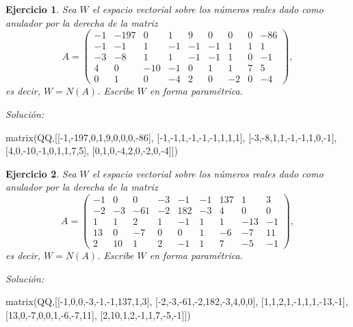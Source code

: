 \documentclass{amsart}
\newtheorem{ejer}{Ejercicio}
\begin{document}


\begin{ejer} Sea $W$ el espacio vectorial sobre los números reales dado
como anulador por la derecha de la matriz 
\[A = \left(\begin{array}{rrrrrrrrr}
-1 & -197 & 0 & 1 & 9 & 0 & 0 & 0 & -86 \\
-1 & -1 & 1 & -1 & -1 & -1 & 1 & 1 & 1 \\
-3 & -8 & 1 & 1 & -1 & -1 & 1 & 0 & -1 \\
4 & 0 & -10 & -1 & 0 & 1 & 1 & 7 & 5 \\
0 & 1 & 0 & -4 & 2 & 0 & -2 & 0 & -4
\end{array}\right),\]
es decir, $W = N(A)$. Escribe $W$ en forma param\'etrica.
\end{ejer}

{\it Soluci\'on:}

\begin{sageblock}
matrix(QQ,[[-1,-197,0,1,9,0,0,0,-86],
[-1,-1,1,-1,-1,-1,1,1,1],
[-3,-8,1,1,-1,-1,1,0,-1],
[4,0,-10,-1,0,1,1,7,5],
[0,1,0,-4,2,0,-2,0,-4]])
\end{sageblock}



\begin{ejer} Sea $W$ el espacio vectorial sobre los números reales dado
como anulador por la derecha de la matriz 
\[A = \left(\begin{array}{rrrrrrrrr}
-1 & 0 & 0 & -3 & -1 & -1 & 137 & 1 & 3 \\
-2 & -3 & -61 & -2 & 182 & -3 & 4 & 0 & 0 \\
1 & 1 & 2 & 1 & -1 & 1 & 1 & -13 & -1 \\
13 & 0 & -7 & 0 & 0 & 1 & -6 & -7 & 11 \\
2 & 10 & 1 & 2 & -1 & 1 & 7 & -5 & -1
\end{array}\right),\]
es decir, $W = N(A)$. Escribe $W$ en forma param\'etrica.
\end{ejer}

{\it Soluci\'on:}

\begin{sageblock}
matrix(QQ,[[-1,0,0,-3,-1,-1,137,1,3],
[-2,-3,-61,-2,182,-3,4,0,0],
[1,1,2,1,-1,1,1,-13,-1],
[13,0,-7,0,0,1,-6,-7,11],
[2,10,1,2,-1,1,7,-5,-1]])
\end{sageblock}

\end{document}
